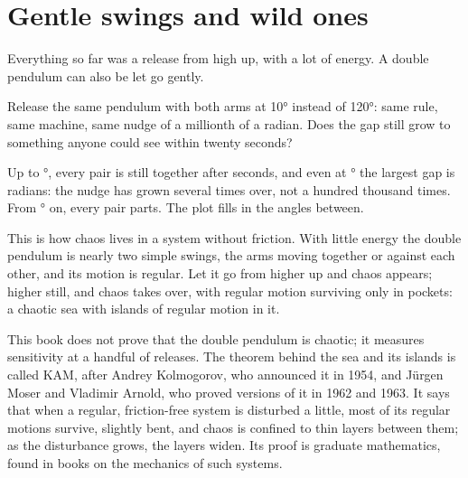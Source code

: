 \section{Gentle swings and wild ones}
\label{sec:ch13-islands}

\noindent
Everything so far was a release from high up, with a lot of energy. A double
pendulum can also be let go gently.

\begin{think}
Release the same pendulum with both arms at 10° instead of 120°: same rule,
same machine, same nudge of a millionth of a radian. Does the gap still grow
to something anyone could see within twenty seconds?
\end{think}



\noindent
Up to °, every pair is still together after
 seconds, and even at ° the largest gap
is  radians: the nudge has grown several times over,
not a hundred thousand times. From ° on, every pair parts. The
plot fills in the angles between.


\noindent
This is how chaos lives in a system without friction. With little energy the
double pendulum is nearly two simple swings, the arms moving together or
against each other, and its motion is regular. Let it go from higher up and
chaos appears; higher still, and chaos takes over, with regular motion
surviving only in pockets: a chaotic sea with islands of regular motion in it.

\begin{rigourbox}
This book does not prove that the double pendulum is chaotic; it measures
sensitivity at a handful of releases. The theorem behind the sea and its
islands is called KAM, after Andrey Kolmogorov, who announced it in 1954, and
Jürgen Moser and Vladimir Arnold, who proved versions of it in 1962 and 1963.
It says
that when a regular, friction-free system is disturbed a little, most of its
regular motions survive, slightly bent, and chaos is confined to thin layers
between them; as the disturbance grows, the layers widen. Its proof is
graduate mathematics, found in books on the mechanics of such systems.
\end{rigourbox}

